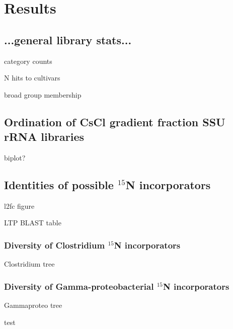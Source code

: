 \section{Results}

\subsection{...general library stats...}

category counts

N hits to cultivars

broad group membership

\subsection{Ordination of CsCl gradient fraction SSU rRNA libraries}

biplot?

\subsection{Identities of possible $^{15}$N incorporators}

l2fc figure

LTP BLAST table

\subsubsection{Diversity of Clostridium $^{15}$N incorporators}

Clostridium tree

\subsubsection{Diversity of Gamma-proteobacterial $^{15}$N incorporators}

Gammaproteo tree

test



